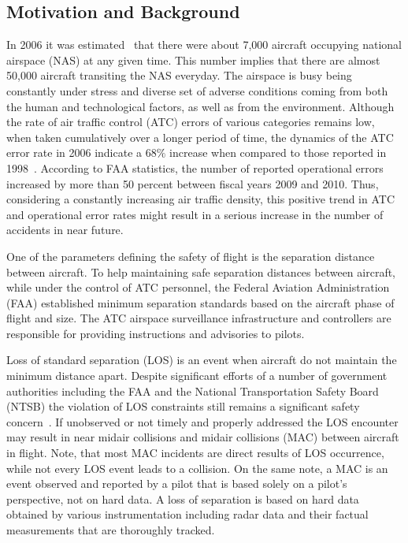 \documentclass[letter,onecolumn,12pt]{aiaa-tc}
\newcommand{\1}{1_n}
\begin{document}
\subsection{Motivation and Background}
In 2006 it was estimated~\cite{FAA_ATO_2006} that there were about 7,000 aircraft occupying national airspace (NAS) at any given time. This number implies that there are almost 50,000 aircraft transiting the NAS everyday. The airspace is busy being constantly under stress and diverse set of adverse conditions coming from both the human and technological factors, as well as from the environment. Although the rate of air traffic control (ATC) errors of various categories remains low,  when taken cumulatively over a longer period of time, the dynamics of the ATC error rate in 2006 indicate a $68\%$  increase when compared to those reported in 1998~\cite{USAToday_2006}. According to FAA statistics, the number of reported operational errors increased by more than 50 percent between fiscal years 2009 and 2010. Thus, considering a constantly increasing air traffic density, this positive trend in ATC and operational error rates might result in a serious increase in the number of accidents in near future.

One of the parameters defining the safety of flight is the separation distance between aircraft. To help maintaining safe separation distances between aircraft, while under the control of ATC personnel, the Federal Aviation Administration (FAA) established minimum separation standards based on the aircraft phase of flight and size. The ATC airspace surveillance infrastructure and controllers are responsible for providing instructions and advisories to pilots.

Loss of standard separation (LOS) is an event when aircraft do not maintain the minimum distance apart. Despite significant efforts of a number of government authorities including the FAA and the National Transportation Safety Board (NTSB) the violation of LOS constraints still remains a significant safety concern~\cite{OIG_AR2013}. If unobserved or not timely and properly addressed the LOS encounter may result in near midair collisions and midair collisions (MAC) between aircraft in flight. Note, that most MAC incidents are direct results of LOS occurrence, while not every LOS event leads to a collision. On the same note, a MAC is an event observed and reported by a pilot that is based solely on a pilot's perspective, not on hard data. A loss of separation is based on hard data obtained by various instrumentation including radar data and their factual measurements that are thoroughly tracked.
\end{document}
